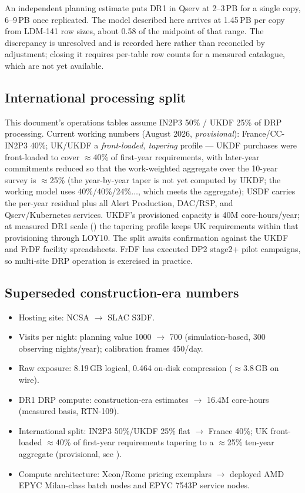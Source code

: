 An independent planning estimate puts DR1 in Qserv at 2--3\,PB for a single
copy, 6--9\,PB once replicated. The model described here arrives at
1.45\,PB per copy from LDM-141 row sizes, about 0.58 of the midpoint of that
range. The discrepancy is unresolved and is recorded here rather than
reconciled by adjustment; closing it requires per-table row counts for a
measured catalogue, which are not yet available.

\subsection{International processing split}\label{sec:ops2026intl}

This document's operations tables assume IN2P3 50\% / UKDF 25\% of DRP
processing. Current working numbers (August 2026, \emph{provisional}):
France/CC-IN2P3 40\%; UK/UKDF a \emph{front-loaded, tapering} profile ---
UKDF purchases were front-loaded to cover $\approx$40\% of first-year
requirements, with later-year commitments reduced so that the work-weighted
aggregate over the 10-year survey is $\approx$25\% (the year-by-year taper is
not yet computed by UKDF; the working model uses 40\%/40\%/24\%$\ldots$,
which meets the aggregate); USDF carries the per-year residual plus all Alert
Production, DAC/RSP, and Qserv/Kubernetes services. UKDF's provisioned capacity
is 40M core-hours/year; at measured DR1 scale
() the tapering profile keeps UK requirements
within that provisioning through LOY10. The split awaits confirmation against
the UKDF and FrDF facility spreadsheets. FrDF has executed DP2 stage2+ pilot
campaigns, so multi-site DRP operation is exercised in practice.

\subsection{Superseded construction-era numbers}\label{sec:ops2026errata}

\begin{itemize}
\item Hosting site: NCSA $\rightarrow$ SLAC S3DF.
\item Visits per night: planning value 1000 $\rightarrow$ 700 (simulation-based,
      300 observing nights/year); calibration frames 450/day.
\item Raw exposure: 8.19\,GB logical, 0.464 on-disk compression
      ($\approx$3.8\,GB on wire).
\item DR1 DRP compute: construction-era estimates $\rightarrow$ 16.4M
      core-hours (measured basis, RTN-109).
\item International split: IN2P3 50\%/UKDF 25\% flat $\rightarrow$
      France 40\%; UK front-loaded $\approx$40\% of first-year requirements
      tapering to a $\approx$25\% ten-year aggregate (provisional, see
      ).
\item Compute architecture: Xeon/Rome pricing exemplars $\rightarrow$ deployed
      AMD EPYC Milan-class batch nodes and EPYC 7543P service nodes.
\end{itemize}

